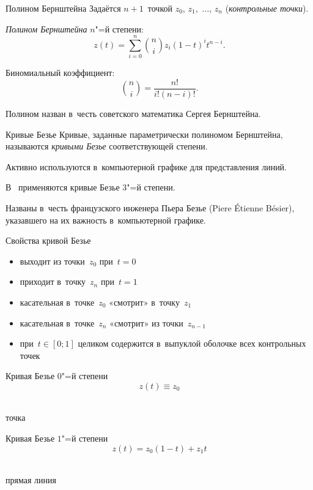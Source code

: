 
\begin{frame}{Полином Бернштейна}
Задаётся $n+1$~точкой $z_0$, $z_1$,~$\ldots$, $z_n$
(\emph{контрольные точки}).

\emph{Полином Бернштейна\/} $n$"=й степени:
	\[
	z(t)=\sum_{i=0}^n\binom niz_i(1-t)^it^{n-i}.
	\]

Биномиальный коэффициент:
	\[
	\binom ni=\frac{n!}{i!(n-i)!}.
	\]

Полином назван в~честь советского математика Сергея Бернштейна.
\end{frame}

\begin{frame}{Кривые Безье}
Кривые, заданные параметрически полиномом Бернштейна, называются \emph{кривыми
Безье\/} соответствующей степени.

Активно используются в~компьютерной графике для представления линий.

В~ применяются кривые Безье $3$"=й степени.

Названы в~честь французского инженера Пьера Безье (Piere Étienne Bésier),
указавшего на их важность в~компьютерной графике.
\end{frame}

\begin{frame}{Свойства кривой Безье}
\begin{itemize}
\item
выходит из точки~$z_0$ при~$t=0$
\item
приходит в~точку~$z_n$ при~$t=1$
\item
касательная в~точке~$z_0$ «смотрит» в~точку~$z_1$
\item
касательная в~точке~$z_n$ «смотрит» из точки~$z_{n-1}$
\item
при~$t\in[0;1]$ целиком содержится в~выпуклой оболочке всех контрольных точек
\end{itemize}
\end{frame}

\begin{frame}{Кривая Безье $0$"=й степени}
	\[
	z(t)\equiv z_0
	\]
\begin{center}
\\[4ex]
точка
\end{center}
\end{frame}

\begin{frame}{Кривая Безье $1$"=й степени}
	\[
	z(t)=z_0(1-t)+z_1t
	\]
\begin{center}
\\[4ex]
прямая линия
\end{center}
\end{frame}

